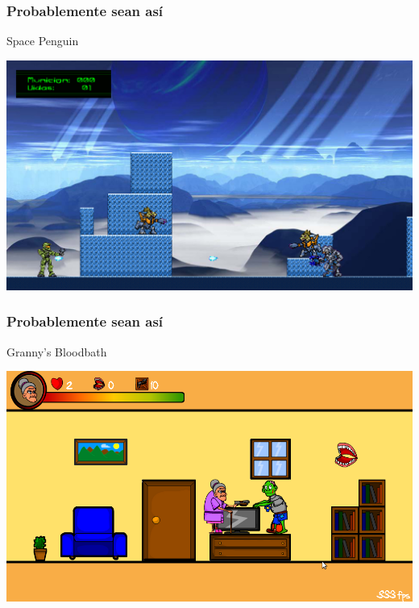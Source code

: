 \begin{frame}
	\frametitle{Probablemente sean así}

	\begin{center}
	Space Penguin
	
	    \includegraphics[scale=0.3]{img/spacepenguin.png}
	\end{center}
\end{frame}

\begin{frame}
	\frametitle{Probablemente sean así}

	\begin{center}
	Granny's Bloodbath
	
	    \includegraphics[scale=0.3]{img/grannysbloodbath.png}
	\end{center}
\end{frame}

